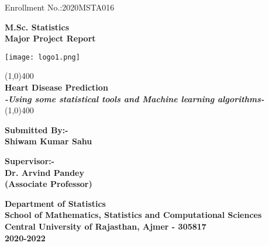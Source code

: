 \documentclass[11pt]{article}
\begin{document}
\begin{titlepage}
\begin{flushright}
 \textsf{Enrollment No.:2020MSTA016}  
\end{flushright}
\begin{center}
\Large{\textbf{M.Sc. Statistics}}\\
\vspace*{0.5cm}
\Large{\textbf{Major Project Report}}\\
\vspace{0.3cm}
\begin{center}
\texttt{[image: logo1.png]}

\end{center}

\vfill
\line(1,0){400}\\[1mm]
\huge{\textbf{Heart Disease Prediction}}\\[3mm]
\large{\textbf{\textit{-Using some statistical tools and Machine learning algorithms-}}}\\[1mm]
\line(1,0){400}\\
\begin{flushleft}
\Large{\textbf{Submitted By:-}}\\
\Large{\textbf{Shiwam Kumar Sahu}}\\

\end{flushleft}
\vspace{-2.5cm}
\begin{flushright}
\Large{\textbf{Supervisor:-}}\\
\Large{\textbf{Dr. Arvind Pandey\\
(Associate Professor)}}\\
\end{flushright}
\vfill

\textbf{Department of Statistics\\
School of Mathematics, Statistics and Computational Sciences\\
Central University of Rajasthan, Ajmer - 305817\\
2020-2022}
\end{center}
\end{titlepage}
\end{document}

